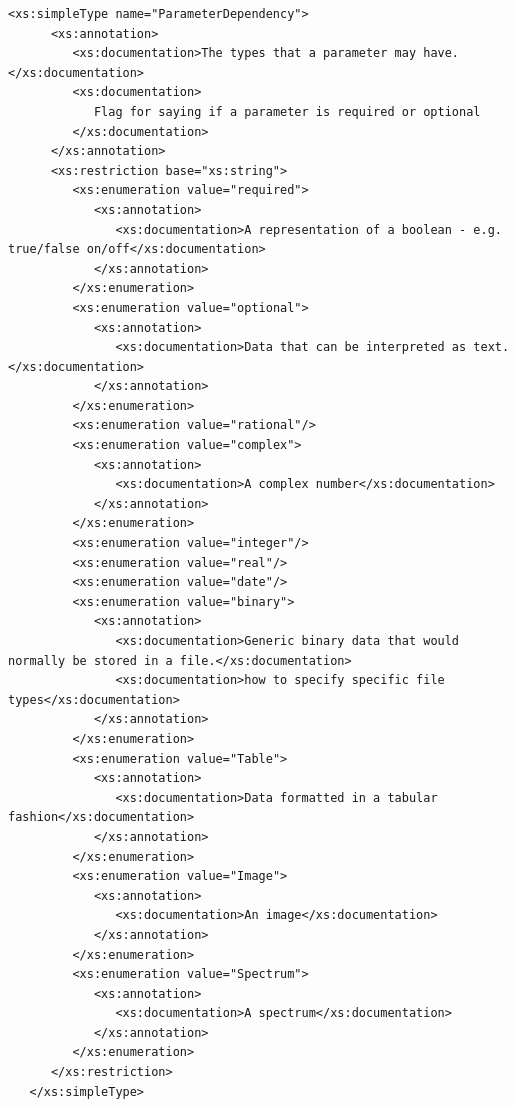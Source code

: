 \documentclass[a4paper,11pt] {ivoa}
\begin{document}
\begin{lstlisting}[style=listXML]
   <xs:simpleType name="ParameterDependency">
      <xs:annotation>
         <xs:documentation>The types that a parameter may have.</xs:documentation>
         <xs:documentation>
            Flag for saying if a parameter is required or optional   
         </xs:documentation>
      </xs:annotation>
      <xs:restriction base="xs:string">
         <xs:enumeration value="required">
            <xs:annotation>
               <xs:documentation>A representation of a boolean - e.g. true/false on/off</xs:documentation>
            </xs:annotation>
         </xs:enumeration>
         <xs:enumeration value="optional">
            <xs:annotation>
               <xs:documentation>Data that can be interpreted as text.</xs:documentation>
            </xs:annotation>
         </xs:enumeration>
         <xs:enumeration value="rational"/>
         <xs:enumeration value="complex">
            <xs:annotation>
               <xs:documentation>A complex number</xs:documentation>
            </xs:annotation>
         </xs:enumeration>
         <xs:enumeration value="integer"/>
         <xs:enumeration value="real"/>
         <xs:enumeration value="date"/>
         <xs:enumeration value="binary">
            <xs:annotation>
               <xs:documentation>Generic binary data that would normally be stored in a file.</xs:documentation>
               <xs:documentation>how to specify specific file types</xs:documentation>
            </xs:annotation>
         </xs:enumeration>
         <xs:enumeration value="Table">
            <xs:annotation>
               <xs:documentation>Data formatted in a tabular fashion</xs:documentation>
            </xs:annotation>
         </xs:enumeration>
         <xs:enumeration value="Image">
            <xs:annotation>
               <xs:documentation>An image</xs:documentation>
            </xs:annotation>
         </xs:enumeration>
         <xs:enumeration value="Spectrum">
            <xs:annotation>
               <xs:documentation>A spectrum</xs:documentation>
            </xs:annotation>
         </xs:enumeration>
      </xs:restriction>
   </xs:simpleType>


\end{lstlisting}
\end{document}
